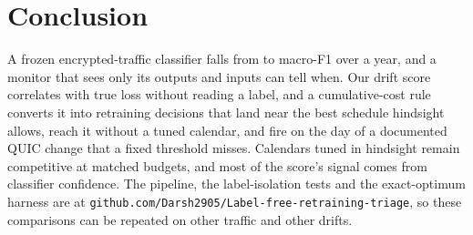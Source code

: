 \documentclass[conference]{IEEEtran}
\begin{document}
\section{Conclusion}
A frozen encrypted-traffic classifier falls from \pzeroref{} to \pzeromin{} macro-F1 over a year, and a monitor that sees only its outputs and inputs can tell when. Our drift score correlates with true loss without reading a label, and a cumulative-cost rule converts it into retraining decisions that land near the best schedule hindsight allows, reach it without a tuned calendar, and fire on the day of a documented QUIC change that a fixed threshold misses. Calendars tuned in hindsight remain competitive at matched budgets, and most of the score's signal comes from classifier confidence. The pipeline, the label-isolation tests and the exact-optimum harness are at \texttt{github.com/Darsh2905/Label-free-retraining-triage}, so these comparisons can be repeated on other traffic and other drifts.

\balance


\end{document}
